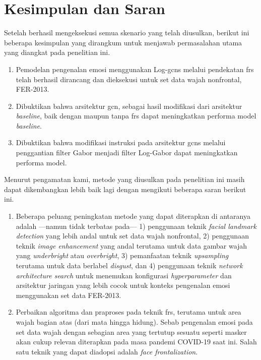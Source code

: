 \chapter{Kesimpulan dan Saran}
Setelah berhasil mengeksekusi semua skenario yang telah diusulkan, berikut ini beberapa kesimpulan yang dirangkum untuk menjawab permasalahan utama yang diangkat pada penelitian ini.
\begin{enumerate}
    \item Pemodelan pengenalan emosi menggunakan Log-\acrshort{gcns} melalui pendekatan \acrshort{frs} telah berhasil dirancang dan dieksekusi untuk set data wajah nonfrontal, FER-2013.
    \item Dibuktikan bahwa arsitektur \acrshort{gcn}, sebagai hasil modifikasi dari arsitektur \textit{baseline}, baik dengan maupun tanpa \acrshort{frs} dapat meningkatkan performa model \textit{baseline}.
    \item Dibuktikan bahwa modifikasi instruksi pada arsitektur \acrshort{gcns} melalui penggantian filter Gabor menjadi filter Log-Gabor dapat meningkatkan performa model.
\end{enumerate}

Menurut pengamatan kami, metode yang diusulkan pada penelitian ini masih dapat dikembangkan lebih baik lagi dengan mengikuti beberapa saran berikut ini.
\begin{enumerate}
    \item Beberapa peluang peningkatan metode yang dapat diterapkan di antaranya adalah ---namun tidak terbatas pada--- 1) penggunaan teknik \textit{facial landmark detection} yang lebih andal untuk set data wajah nonfrontal, 2) penggunaan teknik \textit{image enhancement} yang andal terutama untuk data gambar wajah yang \textit{underbright} atau \textit{overbright}, 3) pemanfaatan teknik \textit{upsampling} terutama untuk data berlabel \textit{disgust}, dan 4) penggunaan teknik \textit{network architecture search} untuk menemukan konfigurasi \textit{hyperparameter} dan arsitektur jaringan yang lebih cocok untuk konteks pengenalan emosi menggunakan set data FER-2013.
    \item Perbaikan algoritma dan praproses pada teknik \acrshort{frs}, terutama untuk area wajah bagian atas (dari mata hingga hidung). Sebab pengenalan emosi pada set data wajah dengan sebagian area yang tertutup sesuatu seperti masker akan cukup relevan diterapkan pada masa pandemi COVID-19 saat ini. Salah satu teknik yang dapat diadopsi adalah \textit{face frontalization}.
\end{enumerate}
